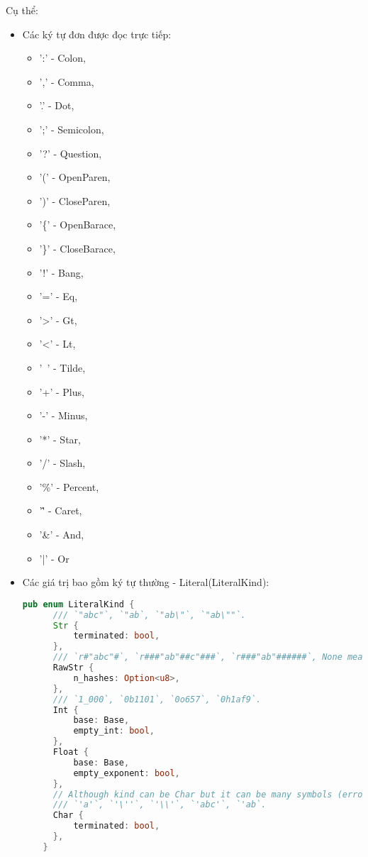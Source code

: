 Cụ thể:

\begin{itemize}
  \item Các ký tự đơn được đọc trực tiếp: 
  \begin{itemize}
    \item ':' - Colon, 
    \item ',' - Comma, 
    \item '.' - Dot, 
    \item ';' - Semicolon, 
    \item '?' - Question, 
    \item '(' - OpenParen,
    \item ')' - CloseParen,
    \item '\{' - OpenBarace,
    \item '\}' - CloseBarace,
    \item '!' - Bang,
    \item '=' - Eq,
    \item '>' - Gt,
    \item '<' - Lt,
    \item '~' - Tilde,
    \item '+' - Plus,
    \item '-' - Minus,
    \item '*' - Star,
    \item '/' - Slash,
    \item '\%' - Percent,
    \item '\^' - Caret,
    \item '\&' - And,
    \item '|' - Or
  \end{itemize}
  \item Các giá trị bao gồm ký tự thường - Literal(LiteralKind):
    \begin{lstlisting}[language=Rust]
    pub enum LiteralKind {
      /// `"abc"`, `"ab`, `"ab\"`, `"ab\""`.
      Str {
          terminated: bool,
      },
      /// `r#"abc"#`, `r###"ab"##c"###`, `r###"ab"######`, None means invalid.
      RawStr {
          n_hashes: Option<u8>,
      },
      /// `1_000`, `0b1101`, `0o657`, `0h1af9`.
      Int {
          base: Base,
          empty_int: bool,
      },
      Float {
          base: Base,
          empty_exponent: bool,
      },
      // Although kind can be Char but it can be many symbols (error). Ex: 'abc' -> error.
      /// `'a'`, `'\''`, `'\\'`, `'abc'`, `'ab`.
      Char {
          terminated: bool,
      },
    }
    \end{lstlisting}

\end{itemize}
